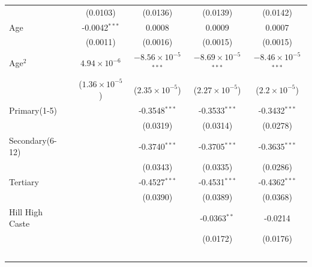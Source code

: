 \begin{tabular}{lccccc}
                                                     &                 & (0.0103)                & (0.0136)                       & (0.0139)                       & (0.0142)\\   
   Age                                               &                 & -0.0042$^{***}$         & 0.0008                         & 0.0009                         & 0.0007\\   
                                                     &                 & (0.0011)                & (0.0016)                       & (0.0015)                       & (0.0015)\\   
   Age$^2$                                      &                 & $4.94\times 10^{-6}$    & $-8.56\times 10^{-5}$$^{***}$  & $-8.69\times 10^{-5}$$^{***}$  & $-8.46\times 10^{-5}$$^{***}$\\    
                                                     &                 & ($1.36\times 10^{-5}$)  & ($2.35\times 10^{-5}$)         & ($2.27\times 10^{-5}$)         & ($2.2\times 10^{-5}$)\\    
   Primary(1-5)           &                 &                         & -0.3548$^{***}$                & -0.3533$^{***}$                & -0.3432$^{***}$\\   
                                                     &                 &                         & (0.0319)                       & (0.0314)                       & (0.0278)\\   
   Secondary(6-12)        &                 &                         & -0.3740$^{***}$                & -0.3705$^{***}$                & -0.3635$^{***}$\\   
                                                     &                 &                         & (0.0343)                       & (0.0335)                       & (0.0286)\\   
   Tertiary               &                 &                         & -0.4527$^{***}$                & -0.4531$^{***}$                & -0.4362$^{***}$\\   
                                                     &                 &                         & (0.0390)                       & (0.0389)                       & (0.0368)\\   
   Hill High Caste                    &                 &                         &                                & -0.0363$^{**}$                 & -0.0214\\   
                                                     &                 &                         &                                & (0.0172)                       & (0.0176)\\   
$$
\end{tabular}
